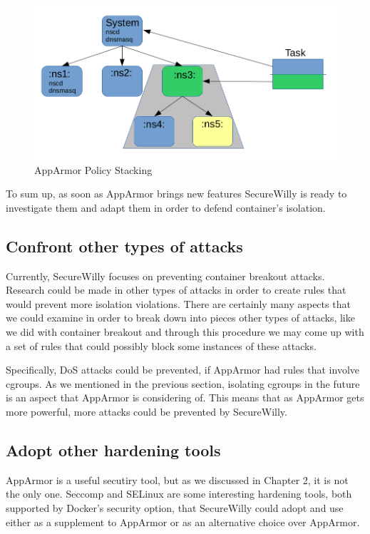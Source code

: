 \begin{figure}[h!]
  \centering
   \includegraphics[width=0.9\linewidth]{../figures/policystacking1.png}
   \caption{AppArmor Policy Stacking}
\end{figure}
\hfill\break

To sum up, as soon as AppArmor brings new features SecureWilly is ready to investigate them and adapt them in order to defend container's isolation.

\subsection{Confront other types of attacks}
Currently, SecureWilly focuses on preventing container breakout attacks. Research could be made in other types of attacks in order to create rules that would prevent more isolation violations. There are certainly many aspects that we could examine in order to break down into pieces other types of attacks, like we did with container breakout and through this procedure we may come up with a set of rules that could possibly block some instances of these attacks.

Specifically, DoS attacks could be prevented, if AppArmor had rules that involve cgroups. As we mentioned in the previous section, isolating cgroups in the future is an aspect that AppArmor is considering of. This means that as AppArmor gets more powerful, more attacks could be prevented by SecureWilly.

\subsection{Adopt other hardening tools}
AppArmor is a useful secutiry tool, but as we discussed in Chapter 2, it is not the only one. Seccomp and SELinux are some interesting hardening tools, both supported by Docker's security option, that SecureWilly could adopt and use either as a supplement to AppArmor or as an alternative choice over AppArmor. 

